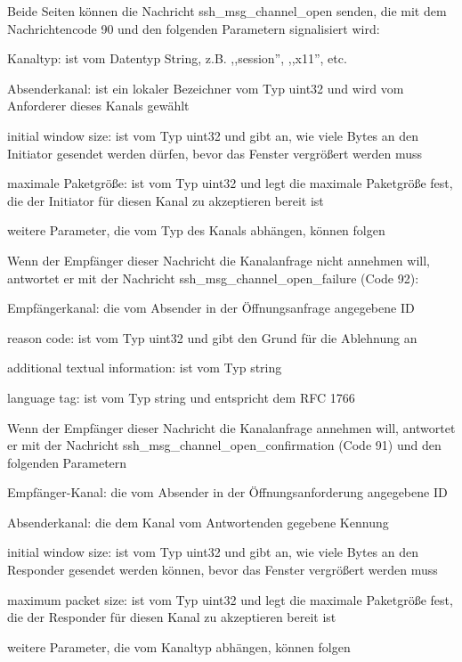 \documentclass[a4paper]{article}
\begin{document}
\begin{multicols}{3}
\begin{itemize*}
\begin{itemize*}
                  \begin{itemize*}
                        \item Beide Seiten können die Nachricht ssh\_msg\_channel\_open senden, die mit dem Nachrichtencode 90 und den folgenden Parametern signalisiert wird:
                        \begin{itemize*} \item Kanaltyp: ist vom Datentyp String, z.B. ,,session'', ,,x11'', etc. \item Absenderkanal: ist ein lokaler Bezeichner vom Typ uint32 und wird vom Anforderer dieses Kanals gewählt \item initial window size: ist vom Typ uint32 und gibt an, wie viele Bytes an den Initiator gesendet werden dürfen, bevor das Fenster vergrößert werden muss \item maximale Paketgröße: ist vom Typ uint32 und legt die maximale Paketgröße fest, die der Initiator für diesen Kanal zu akzeptieren bereit ist \item weitere Parameter, die vom Typ des Kanals abhängen, können folgen \end{itemize*}
                        \item Wenn der Empfänger dieser Nachricht die Kanalanfrage nicht annehmen will, antwortet er mit der Nachricht ssh\_msg\_channel\_open\_failure (Code 92):
                        \begin{itemize*} \item Empfängerkanal: die vom Absender in der Öffnungsanfrage angegebene ID \item reason code: ist vom Typ uint32 und gibt den Grund für die Ablehnung an \item additional textual information: ist vom Typ string \item language tag: ist vom Typ string und entspricht dem RFC 1766 \end{itemize*}
                        \item Wenn der Empfänger dieser Nachricht die Kanalanfrage annehmen will, antwortet er mit der Nachricht ssh\_msg\_channel\_open\_confirmation (Code 91) und den folgenden Parametern
                        \begin{itemize*} \item Empfänger-Kanal: die vom Absender in der Öffnungsanforderung angegebene ID \item Absenderkanal: die dem Kanal vom Antwortenden gegebene Kennung \item initial window size: ist vom Typ uint32 und gibt an, wie viele Bytes an den Responder gesendet werden können, bevor das Fenster vergrößert werden muss \item maximum packet size: ist vom Typ uint32 und legt die maximale Paketgröße fest, die der Responder für diesen Kanal zu akzeptieren bereit ist \item weitere Parameter, die vom Kanaltyp abhängen, können folgen \end{itemize*}

\end{itemize*}
\end{itemize*}
\end{itemize*}
\end{multicols}
\end{document}
